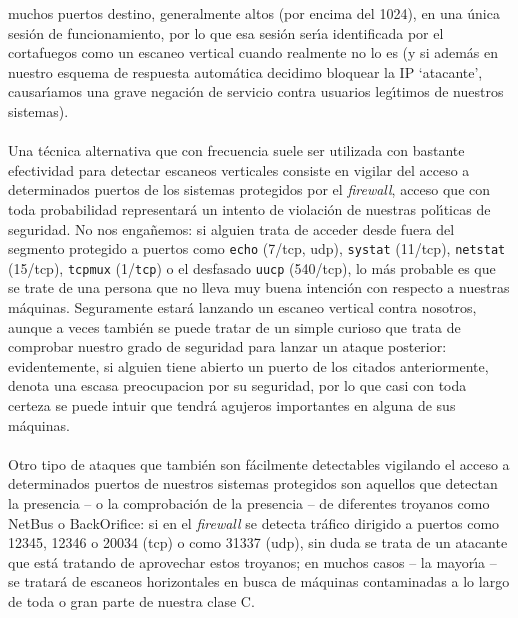muchos puertos destino, generalmente altos (por encima del 1024), en una 
\'unica sesi\'on de funcionamiento, por lo que esa sesi\'on ser\'{\i}a 
identificada por el cortafuegos como un escaneo vertical cuando realmente no lo
es (y si adem\'as en nuestro esquema de respuesta autom\'atica decidimo bloquear
la IP `atacante', causar\'{\i}amos una grave negaci\'on de servicio contra
usuarios leg\'{\i}timos de nuestros sistemas).\\
\\Una t\'ecnica alternativa que con frecuencia suele ser utilizada con bastante
efectividad para detectar escaneos verticales consiste en vigilar del
acceso a determinados puertos de los sistemas protegidos por el {\it firewall}, 
acceso 
que con toda probabilidad representar\'a un intento de violaci\'on de nuestras 
pol\'{\i}ticas de seguridad. No nos enga\~nemos: si alguien trata de acceder 
desde fuera del segmento protegido a puertos como {\tt echo} (7/{\sc tcp},{\sc 
udp}), {\tt systat} (11/{\sc tcp}), {\tt netstat} (15/{\sc tcp}), {\tt tcpmux}
(1/{\tt tcp}) o el desfasado {\tt uucp} (540/{\sc tcp}), lo m\'as probable es 
que se trate de una persona que no lleva muy buena intenci\'on con respecto a 
nuestras m\'aquinas. Seguramente estar\'a lanzando un escaneo vertical contra
nosotros, aunque a veces tambi\'en se puede tratar de un simple curioso que 
trata de comprobar
nuestro grado de seguridad para lanzar un ataque posterior: evidentemente, si
alguien tiene abierto un puerto de los citados anteriormente, denota una
escasa preocupacion por su seguridad, por lo que casi con toda certeza se puede
intuir que tendr\'a agujeros importantes en alguna de sus m\'aquinas.\\
\\Otro tipo de ataques que tambi\'en son f\'acilmente detectables vigilando el
acceso a determinados puertos de nuestros sistemas protegidos son aquellos que
detectan la presencia -- o la comprobaci\'on de la presencia -- de diferentes 
troyanos como NetBus o BackOrifice: si en el {\it firewall} se detecta 
tr\'afico dirigido a puertos como 12345, 12346 o 20034 ({\sc tcp}) o como 
31337 ({\sc udp}), sin duda se trata de un atacante que est\'a tratando de
aprovechar estos troyanos; en muchos casos -- la mayor\'{\i}a -- se tratar\'a de
escaneos horizontales en busca de m\'aquinas contaminadas a lo largo de toda o
gran parte de nuestra clase C.
